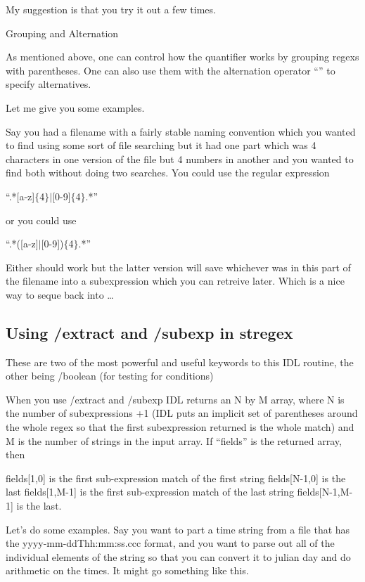   My suggestion is that you try it out a few times.



\item Grouping and Alternation

  As mentioned above, one can control how the quantifier works by
  grouping regexs with parentheses. One can also use them with the
  alternation operator ``\VB'' to specify alternatives.

  Let me give you some examples.

  Say you had a filename with a fairly stable naming convention which
  you wanted to find using some sort of file searching but it had one
  part which was 4 characters in one version of the file but 4 numbers
  in another and you wanted to find both without doing two
  searches. You could use the regular expression

  ``.*[a-z]$\{$4$\}|$[0-9]$\{$4$\}$.*'' 

  or you could use 

  ``.*([a-z]$|$[0-9])$\{$4$\}$.*''

  Either should work but the latter version will save whichever was in
  this part of the filename into a subexpression which you can
  retreive later. Which is a nice way to seque back into \ldots





  \ei

  \subsection{Using /extract and /subexp in stregex}

  These are two of the most powerful and useful keywords to this IDL
  routine, the other being /boolean (for testing for conditions)


  When you use /extract and /subexp IDL returns an N by M array, where
  N is the number of subexpressions +1 (IDL puts an implicit set of
  parentheses around the whole regex so that the first subexpression
  returned is the whole match) and M is the number of strings in the
  input array. If ``fields'' is the returned array, then

  fields[1,0] is the first sub-expression match of the first string
  fields[N-1,0] is the last
  fields[1,M-1] is the first sub-expression match of the last string 
  fields[N-1,M-1] is the last.


  Let's do some examples. Say you want to part a time string from a
  file that has the yyyy-mm-ddThh:mm:ss.ccc format, and you want to
  parse out all of the individual elements of the string so that you
  can convert it to julian day and do arithmetic on the times. It
  might go something like this.

